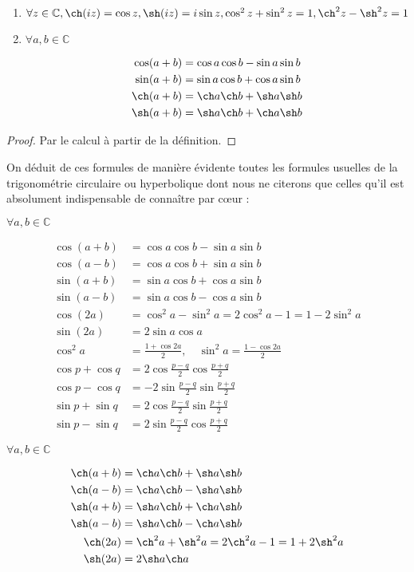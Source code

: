 \begin{prop}
\begin{enumerate}
\item $\forall z \in \mathbb{C}, \ch(iz) = \cos z, \sh(iz) = i \sin z, \cos^2 z + \sin^2 z = 1, \ch^2 z - \sh^2 z = 1$
\item $\forall a, b \in \mathbb{C}$

\begin{align*}
\cos(a+b) &= \cos a \cos b - \sin a \sin b \\
\sin(a+b) &= \sin a \cos b + \cos a \sin b \\
\ch(a+b) &= \ch a \ch b + \sh a \sh b \\
\sh(a+b) &= \sh a \ch b + \ch a \sh b
\end{align*}
\end{enumerate}
\end{prop}

\begin{proof}
Par le calcul à partir de la définition.
\end{proof}

\begin{rem}
On déduit de ces formules de manière évidente toutes les formules usuelles de la trigonométrie circulaire ou hyperbolique dont nous ne citerons que celles qu'il est absolument indispensable de connaître par cœur :

$\forall a, b \in \mathbb{C}$

\begin{align*}
\cos(a+b) &= \cos a \cos b - \sin a \sin b \\
\cos(a-b) &= \cos a \cos b + \sin a \sin b \\
\sin(a+b) &= \sin a \cos b + \cos a \sin b \\
\sin(a-b) &= \sin a \cos b - \cos a \sin b \\
\cos(2a) &= \cos^2 a - \sin^2 a = 2\cos^2 a - 1 = 1 - 2\sin^2 a \\
\sin(2a) &= 2 \sin a \cos a \\
\cos^2 a &= \frac{1 + \cos 2a}{2}, \quad \sin^2 a = \frac{1 - \cos 2a}{2} \\
\cos p + \cos q &= 2 \cos\frac{p-q}{2} \cos\frac{p+q}{2} \\
\cos p - \cos q &= -2 \sin\frac{p-q}{2} \sin\frac{p+q}{2} \\
\sin p + \sin q &= 2 \cos\frac{p-q}{2} \sin\frac{p+q}{2} \\
\sin p - \sin q &= 2 \sin\frac{p-q}{2} \cos\frac{p+q}{2}
\end{align*}

$\forall a, b \in \mathbb{C}$

\begin{align*}
\ch(a+b) &= \ch a \ch b + \sh a \sh b \\
\ch(a-b) &= \ch a \ch b - \sh a \sh b \\
\sh(a+b) &= \sh a \ch b + \ch a \sh b \\
\sh(a-b) &= \sh a \ch b - \ch a \sh b \\
\ch(2a) &= \ch^2 a + \sh^2 a = 2\ch^2 a - 1 = 1 + 2\sh^2 a \\
\sh(2a) &= 2 \sh a \ch a
\end{align*}
\end{rem}

